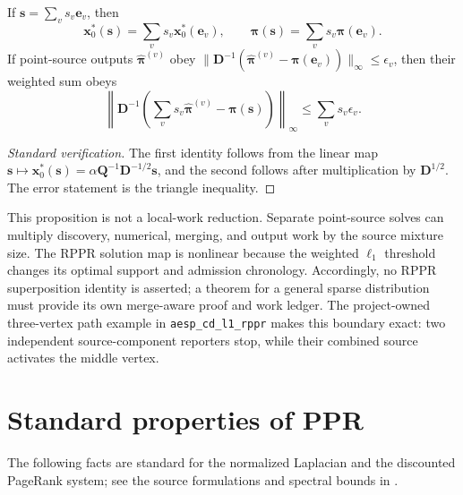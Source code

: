 \documentclass[11pt]{article}
\begin{document}
\begin{proposition}
\label{prop:problem-definitions-ppr-superposition}
If $\bm{s}=\sum_v s_v\bm{e}_v$, then
\begin{equation}
 \bm{x}_0^*(\bm{s})=\sum_v s_v\bm{x}_0^*(\bm{e}_v),
 \qquad
 \bm{\pi}(\bm{s})=\sum_v s_v\bm{\pi}(\bm{e}_v).
 \label{eq:problem-definitions-ppr-superposition}
\end{equation}
If point-source outputs $\widehat{\bm{\pi}}^{(v)}$ obey
$\|\bm{D}^{-1}(\widehat{\bm{\pi}}^{(v)}-
\bm{\pi}(\bm{e}_v))\|_\infty\leq\epsilon_v$, then their weighted sum obeys
\begin{equation}
 \left\|\bm{D}^{-1}\left(
  \sum_v s_v\widehat{\bm{\pi}}^{(v)}-\bm{\pi}(\bm{s})
 \right)\right\|_\infty
 \leq\sum_v s_v\epsilon_v.
 \label{eq:problem-definitions-ppr-superposition-error}
\end{equation}
\end{proposition}

\begin{proof}[Standard verification]
The first identity follows from the linear map
$\bm{s}\mapsto \bm{x}_0^*(\bm{s})=
\alpha \bm{Q}^{-1}\bm{D}^{-1/2}\bm{s}$, and the second follows after
multiplication by $\bm{D}^{1/2}$.  The error statement is the triangle
inequality.
\end{proof}

This proposition is not a local-work reduction.  Separate point-source solves
can multiply discovery, numerical, merging, and output work by the source
mixture size.  The RPPR solution map is nonlinear because the weighted
$\ell_1$ threshold changes its optimal support and admission chronology.
Accordingly, no RPPR superposition identity is asserted; a theorem for a
general sparse distribution must provide its own merge-aware proof and work
ledger.  The project-owned three-vertex path example in
\texttt{aesp\_cd\_l1\_rppr} makes this boundary exact: two independent
source-component reporters stop, while their combined source activates
the middle vertex.

\section{Standard properties of PPR}
\label{sec:problem-definitions-ppr-properties}

The following facts are standard for the normalized Laplacian and the
discounted PageRank system; see the source formulations and spectral bounds
in \citet{fountoulakis2019variational,fountoulakis2026complexity,
zhou2024iterative,huang2025accelerated}.
\end{document}

